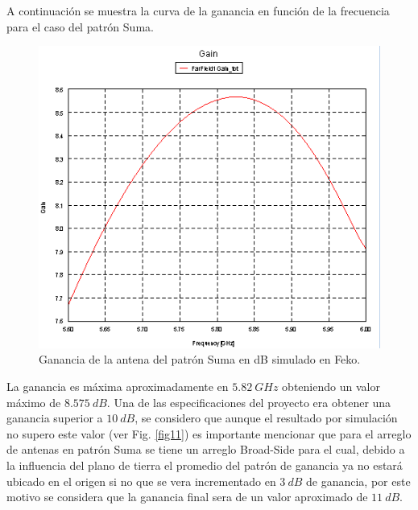 \documentclass[twocolumn]{IEEEtran}
\begin{document}
\noindent
A continuación se muestra la curva de la ganancia en función de la frecuencia para el caso del patrón Suma.
\begin{figure}[H]
	\centering
		\includegraphics[scale=0.62]{gan_suma.png}
	\caption{Ganancia de la antena del patrón Suma en dB simulado en Feko.}
	\label{fig12}
\end{figure}
\noindent
La ganancia es máxima aproximadamente en $5.82\ GHz$ obteniendo un valor máximo de $8.575\ dB$. Una de las especificaciones del proyecto era obtener una ganancia superior a $10\ dB$, se considero que aunque el resultado por simulación no supero este valor (ver Fig. \ref{fig11}) es importante mencionar que para el arreglo de antenas en patrón Suma se tiene un arreglo Broad-Side para el cual, debido a la influencia del plano de tierra el promedio del patrón de ganancia ya no estará ubicado en el origen si no que se vera incrementado en $3\ dB$ de ganancia, por este motivo se considera que la ganancia final sera de un valor aproximado de $11\ dB$.
\end{document}
